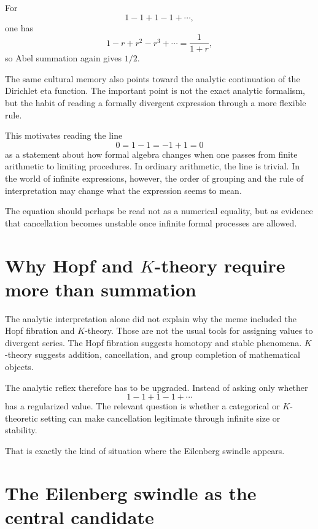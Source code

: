 For
\[
  1-1+1-1+\cdots,
\]
one has
\[
  1-r+r^2-r^3+\cdots=\frac{1}{1+r},
\]
so Abel summation again gives \(1/2\).

\begin{remark}
The same cultural memory also points toward the analytic continuation of the Dirichlet eta function.  The important point is not the exact analytic formalism, but the habit of reading a formally divergent expression through a more flexible rule.
\end{remark}

This motivates reading the line
\[
  0=1-1=-1+1=0
\]
as a statement about how formal algebra changes when one passes from finite arithmetic to limiting procedures.  In ordinary arithmetic, the line is trivial.  In the world of infinite expressions, however, the order of grouping and the rule of interpretation may change what the expression seems to mean.

\begin{claim}
The equation should perhaps be read not as a numerical equality, but as evidence that cancellation becomes unstable once infinite formal processes are allowed.
\end{claim}

\section[Why Hopf and K-theory require more than summation]{Why Hopf and \(K\)-theory require more than summation}

The analytic interpretation alone did not explain why the meme included the Hopf fibration and \(K\)-theory.  Those are not the usual tools for assigning values to divergent series.  The Hopf fibration suggests homotopy and stable phenomena.  \(K\)-theory suggests addition, cancellation, and group completion of mathematical objects.

The analytic reflex therefore has to be upgraded.  Instead of asking only whether
\[
  1-1+1-1+\cdots
\]
has a regularized value.  The relevant question is whether a categorical or \(K\)-theoretic setting can make cancellation legitimate through infinite size or stability.

That is exactly the kind of situation where the Eilenberg swindle appears.

\section{The Eilenberg swindle as the central candidate}

